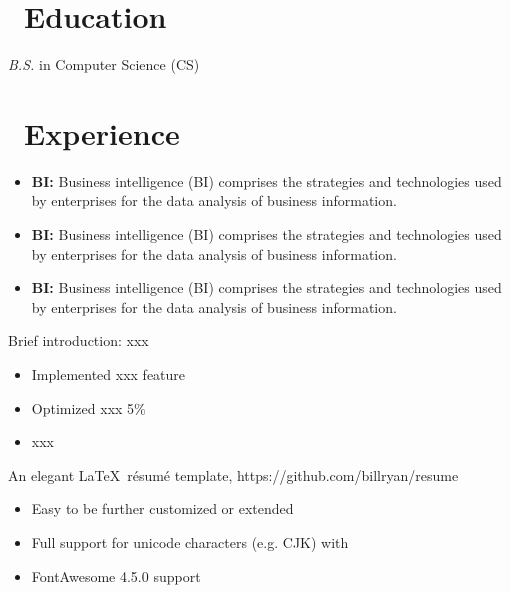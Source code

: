 \documentclass{resume}
\begin{document}



\section{\faGraduationCap\ Education}
\textit{B.S.} in Computer Science (CS)

\section{\faUsers\ Experience}
\role{Senior Software Engineer}
\begin{itemize}
  \item \textbf{BI:} Business intelligence (BI) comprises the strategies and technologies used by enterprises for the data analysis of business information.
  \item \textbf{BI:} Business intelligence (BI) comprises the strategies and technologies used by enterprises for the data analysis of business information.
  \item \textbf{BI:} Business intelligence (BI) comprises the strategies and technologies used by enterprises for the data analysis of business information.
\end{itemize}

Brief introduction: xxx
\begin{itemize}
  \item Implemented xxx feature
  \item Optimized xxx 5\%
  \item xxx
\end{itemize}

An elegant \LaTeX\ résumé template, https://github.com/billryan/resume
\begin{itemize}
  \item Easy to be further customized or extended
  \item Full support for unicode characters (e.g. CJK) with \XeLaTeX\
  \item FontAwesome 4.5.0 support
\end{itemize}
\end{document}

